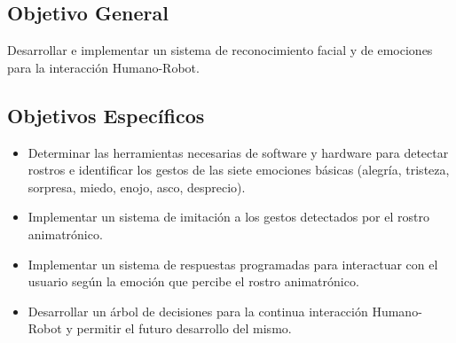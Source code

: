 \subsection*{Objetivo General}
Desarrollar e implementar un sistema de reconocimiento facial y de emociones para la interacción Humano-Robot.

\subsection*{Objetivos Específicos}
\begin{itemize}
\item Determinar las herramientas necesarias de software y hardware para detectar rostros e identificar los gestos de las siete emociones básicas (alegría, tristeza, sorpresa, miedo, enojo, asco, desprecio).
\item Implementar un sistema de imitación a los gestos detectados por el rostro animatrónico.
\item Implementar un sistema de respuestas programadas para interactuar con el usuario según la emoción que percibe el rostro animatrónico.
\item Desarrollar un árbol de decisiones para la continua interacción Humano-Robot y permitir el futuro desarrollo del mismo.
\end{itemize}
